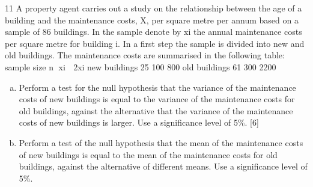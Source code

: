 \documentclass[a4paper,12pt]{article}
\begin{document}
11 A property agent carries out a study on the relationship between the age of a building and the maintenance costs, X, per square metre per annum based on a sample of 86 buildings. In the sample denote by xi the annual maintenance costs per square metre
for building i. In a first step the sample is divided into new and old buildings. The
maintenance costs are summarised in the following table:
  sample size n xi  2xi
new buildings 25 100 800
old buildings 61 300 2200
\begin{enumerate}[(a)]
\item Perform a test for the null hypothesis that the variance of the maintenance costs of new buildings is equal to the variance of the maintenance costs for old buildings, against the alternative that the variance of the maintenance costs of new buildings is larger. Use a significance level of 5\%. [6]

\item Perform a test of the null hypothesis that the mean of the maintenance costs of new buildings is equal to the mean of the maintenance costs for old buildings, against the alternative of different means. Use a significance level of 5\%. 
\end{enumerate}
\end{document}

